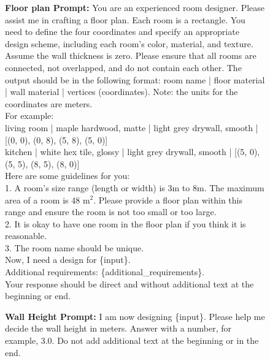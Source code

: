 \begin{figure}[!b]
    \centering
    \begin{center}
    
    \begin{tcolorbox} [top=2pt,bottom=2pt, width=\linewidth, boxrule=1pt]
    {\footnotesize {\selectfont
    \textbf{Floor plan Prompt:}
    You are an experienced room designer. Please assist me in crafting a floor plan. Each room is a rectangle. You need to define the four coordinates and specify an appropriate design scheme, including each room's color, material, and texture.
    Assume the wall thickness is zero. Please ensure that all rooms are connected, not overlapped, and do not contain each other. The output should be in the following format: room name | floor material | wall material | vertices (coordinates). Note: the units for the coordinates are meters. \\
    For example: \\
    living room | maple hardwood, matte | light grey drywall, smooth | [(0, 0), (0, 8), (5, 8), (5, 0)]\\
    kitchen | white hex tile, glossy | light grey drywall, smooth | [(5, 0), (5, 5), (8, 5), (8, 0)] \\
    
    Here are some guidelines for you: \\
    1. A room's size range (length or width) is 3m to 8m. The maximum area of a room is 48 m$^2$. Please provide a floor plan within this range and ensure the room is not too small or too large. \\
    2. It is okay to have one room in the floor plan if you think it is reasonable. \\
    3. The room name should be unique. \\
    
    Now, I need a design for \{input\}. \\
    Additional requirements: \{additional\_requirements\}. \\
    
    Your response should be direct and without additional text at the beginning or end.
    }
    \par}
    \end{tcolorbox}

    \begin{tcolorbox} [top=2pt,bottom=2pt, width=\linewidth, boxrule=1pt]
    {\footnotesize {\selectfont
    \textbf{Wall Height Prompt:}
    I am now designing \{input\}. Please help me decide the wall height in meters.
    Answer with a number, for example, 3.0. Do not add additional text at the beginning or in the end.
    }
    \par}
    \end{tcolorbox}


\end{center}
\end{figure}
